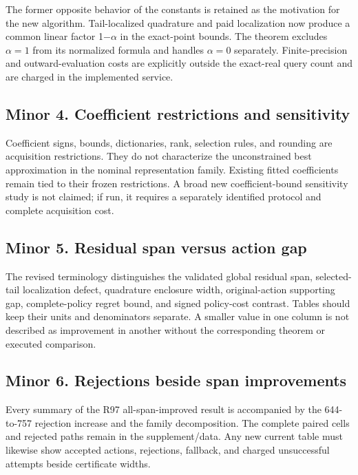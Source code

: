 The former opposite behavior of the constants is retained as the motivation for the new algorithm. Tail-localized quadrature and paid localization now produce a common linear factor 1\ensuremath{-}\ensuremath{\alpha} in the exact-point bounds. The theorem excludes \(\alpha=1\) from its normalized formula and handles \(\alpha=0\) separately. Finite-precision and outward-evaluation costs are explicitly outside the exact-real query count and are charged in the implemented service.

\hypertarget{minor-4.-coefficient-restrictions-and-sensitivity}{%
\subsection{Minor 4. Coefficient restrictions and sensitivity}\label{minor-4.-coefficient-restrictions-and-sensitivity}}

Coefficient signs, bounds, dictionaries, rank, selection rules, and rounding are acquisition restrictions. They do not characterize the unconstrained best approximation in the nominal representation family. Existing fitted coefficients remain tied to their frozen restrictions. A broad new coefficient-bound sensitivity study is not claimed; if run, it requires a separately identified protocol and complete acquisition cost.

\hypertarget{minor-5.-residual-span-versus-action-gap}{%
\subsection{Minor 5. Residual span versus action gap}\label{minor-5.-residual-span-versus-action-gap}}

The revised terminology distinguishes the validated global residual span, selected-tail localization defect, quadrature enclosure width, original-action supporting gap, complete-policy regret bound, and signed policy-cost contrast. Tables should keep their units and denominators separate. A smaller value in one column is not described as improvement in another without the corresponding theorem or executed comparison.

\hypertarget{minor-6.-rejections-beside-span-improvements}{%
\subsection{Minor 6. Rejections beside span improvements}\label{minor-6.-rejections-beside-span-improvements}}

Every summary of the R97 all-span-improved result is accompanied by the 644-to-757 rejection increase and the family decomposition. The complete paired cells and rejected paths remain in the supplement/data. Any new current table must likewise show accepted actions, rejections, fallback, and charged unsuccessful attempts beside certificate widths.

